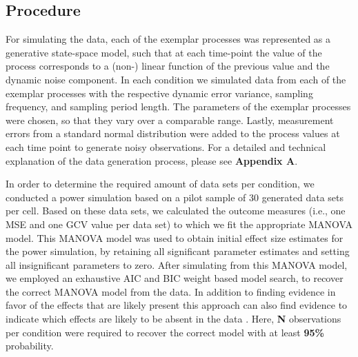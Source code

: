 
\subsection{Procedure}

For simulating the data, each of the exemplar processes was represented as a
generative state-space model, such that at each time-point the value of the
process corresponds to a (non-) linear function of the previous value and the
dynamic noise component. In each condition we simulated data from each of the
exemplar processes with the respective dynamic error variance, sampling
frequency, and sampling period length. The parameters of the exemplar processes
were chosen, so that they vary over a comparable range. Lastly, measurement
errors from a standard normal distribution were added to the process values at
each time point to generate noisy observations.
For a detailed and technical explanation of the data
generation process, please see \textbf{Appendix A}.

In order to determine the required amount of data sets per condition,
we conducted a power simulation based on a pilot
sample of 30 generated data sets per cell. Based on these data sets, we
calculated the outcome measures (i.e., one MSE and one GCV value per data set)
to which we fit the appropriate MANOVA model. This MANOVA model was used to
obtain initial effect size estimates for the power simulation, by retaining all
significant parameter estimates and setting all insignificant parameters to
zero. After simulating from this MANOVA model, we employed an exhaustive
AIC and BIC weight based model search, to recover the correct MANOVA
model from the data. In addition to finding evidence in favor of the
effects that are likely present this approach can
also find evidence to indicate which effects are likely to be absent in the
data \parencite{wagenmakers_aic_2004}. Here, \textbf{N} observations per
condition were required to recover the correct model with at least
\textbf{95\%} probability.